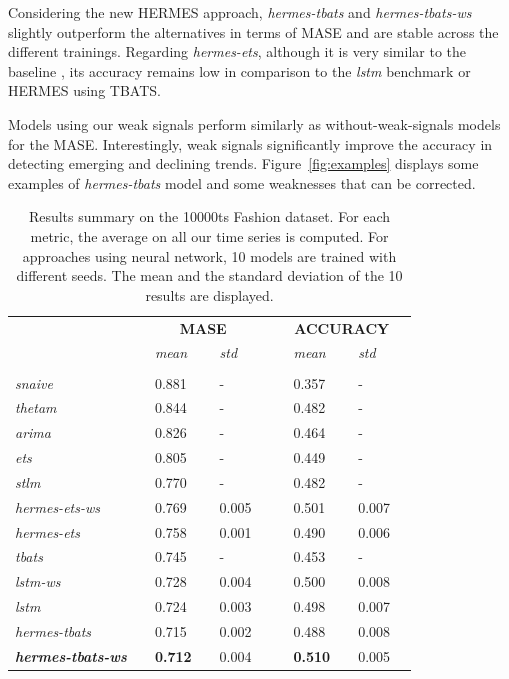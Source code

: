 \documentclass[lettersize,journal]{IEEEtran}
\begin{document}
Considering the new HERMES approach, \textit{hermes-tbats} and \textit{hermes-tbats-ws} slightly outperform the alternatives in terms of MASE and are stable across the different trainings. Regarding \textit{hermes-ets},   although it is very similar to the baseline \cite{smyl2020hybrid}, its accuracy remains low in comparison to the \textit{lstm} benchmark or HERMES using TBATS. 

Models using our weak signals perform similarly as without-weak-signals models for the MASE.  Interestingly, weak signals significantly improve the accuracy in detecting emerging and declining trends. Figure~\ref{fig:examples} displays some examples of \textit{hermes-tbats} model and some weaknesses that can be corrected.

\begin{table}
  \caption{Results summary on the 10000ts Fashion dataset. For each metric, the average on all our time series is computed. For approaches using neural network, 10 models are trained with different seeds. The mean and the standard deviation of the 10 results are displayed.}
  \centering
  \begin{tabular}{l||lllll|lllll}
   &&\multicolumn{3}{c}{\textbf{MASE}} &&& \multicolumn{3}{c}{\textbf{ACCURACY}}&\\
    &&  \textit{mean}  && \textit{std} &&&  \textit{mean}  && \textit{std}& \\
	 \hline
	 &&&&&&&&&&\\
     \textit{snaive} && 0.881 && - &&& 0.357 && - &\\
     \textit{thetam}  && 0.844 && -&&& 0.482 && - &\\
     \textit{arima} && 0.826 && -&&& 0.464 && - & \\
     \textit{ets} && 0.805 && -&&& 0.449 && - & \\
     \textit{stlm} && 0.770 && -&&& 0.482 && - & \\
     \textit{hermes-ets-ws} && 0.769 && 0.005 &&& 0.501 && 0.007 &\\
     \textit{hermes-ets} && 0.758 && 0.001 &&& 0.490 && 0.006 &\\
     \textit{tbats} && 0.745 && -&&& 0.453 && - & \\
     \textit{lstm-ws} && 0.728 && 0.004 &&& 0.500 && 0.008 &\\
     \textit{lstm} && 0.724 && 0.003 &&& 0.498 && 0.007 &\\
     \textit{hermes-tbats} && 0.715 && 0.002 &&& 0.488 && 0.008 &\\
     \textbf{\textit{hermes-tbats-ws}} && \textbf{0.712} && 0.004 &&& \textbf{0.510} && 0.005 &\\
  \end{tabular}
\label{tab:metricresults}
\end{table}
\end{document}
